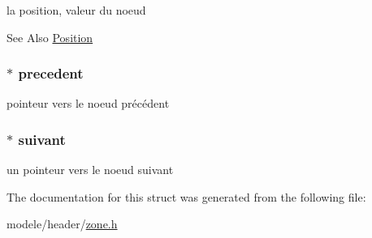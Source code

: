 la position, valeur du noeud 

\begin{DoxySeeAlso}{See Also}
\hyperlink{struct_position}{Position} 
\end{DoxySeeAlso}
\hypertarget{struct_noeud_position_a404485a763dfd5c73c7aa319e8c6f1bf}{
\subsubsection[{precedent}]{$\ast$ precedent}}\label{struct_noeud_position_a404485a763dfd5c73c7aa319e8c6f1bf}


pointeur vers le noeud précédent 

\hypertarget{struct_noeud_position_a0c42a292ccbdd10a535e9415f955281d}{
\subsubsection[{suivant}]{$\ast$ suivant}}\label{struct_noeud_position_a0c42a292ccbdd10a535e9415f955281d}


un pointeur vers le noeud suivant 



The documentation for this struct was generated from the following file\-:\begin{DoxyCompactItemize}
\item 
modele/header/\hyperlink{zone_8h}{zone.\-h}\end{DoxyCompactItemize}
